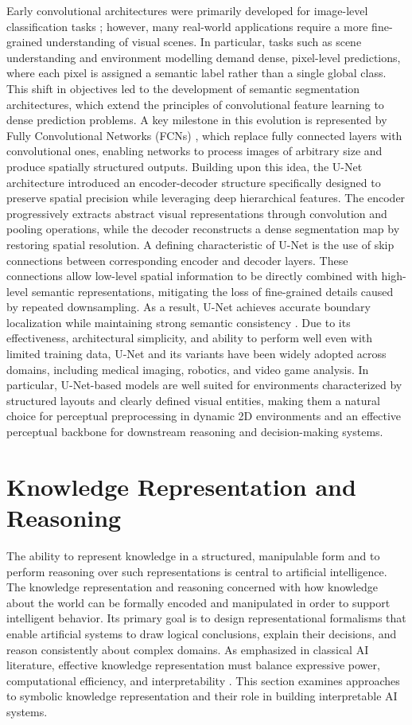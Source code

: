 \documentclass[12pt,a4paper]{report}
\begin{document}
Early convolutional architectures were primarily developed for image-level classification tasks \cite{chiave60}; however, many real-world applications require a more fine-grained understanding of visual scenes. In particular, tasks such as scene understanding and environment modelling demand dense, pixel-level predictions, where each pixel is assigned a semantic label rather than a single global class.
This shift in objectives led to the development of semantic segmentation architectures, which extend the principles of convolutional feature learning to dense prediction problems. A key milestone in this evolution is represented by Fully Convolutional Networks (FCNs) \cite{chiave34}, which replace fully connected layers with convolutional ones, enabling networks to process images of arbitrary size and produce spatially structured outputs.
Building upon this idea, the U-Net architecture \cite{chiave36} introduced an encoder-decoder structure specifically designed to preserve spatial precision while leveraging deep hierarchical features. The encoder progressively extracts abstract visual representations through convolution and pooling operations, while the decoder reconstructs a dense segmentation map by restoring spatial resolution.
A defining characteristic of U-Net is the use of skip connections between corresponding encoder and decoder layers. These connections allow low-level spatial information to be directly combined with high-level semantic representations, mitigating the loss of fine-grained details caused by repeated downsampling. As a result, U-Net achieves accurate boundary localization while maintaining strong semantic consistency \cite{chiave36}.
Due to its effectiveness, architectural simplicity, and ability to perform well even with limited training data, U-Net and its variants have been widely adopted across domains, including medical imaging, robotics, and video game analysis. In particular, U-Net-based models are well suited for environments characterized by structured layouts and clearly defined visual entities, making them a natural choice for perceptual preprocessing in dynamic 2D environments and an effective perceptual backbone for downstream reasoning and decision-making systems.


\section{Knowledge Representation and Reasoning}

The ability to represent knowledge in a structured, manipulable form and to perform reasoning over such representations is central to artificial intelligence. 
The knowledge representation and reasoning concerned with how knowledge about the world can be formally encoded and manipulated in order to support intelligent behavior. Its primary goal is to design representational formalisms that enable artificial systems to draw logical conclusions, explain their decisions, and reason consistently about complex domains. As emphasized in classical AI literature, effective knowledge representation must balance expressive power, computational efficiency, and interpretability \cite{chiave6}.
This section examines approaches to symbolic knowledge representation and their role in building interpretable AI systems.
\end{document}
